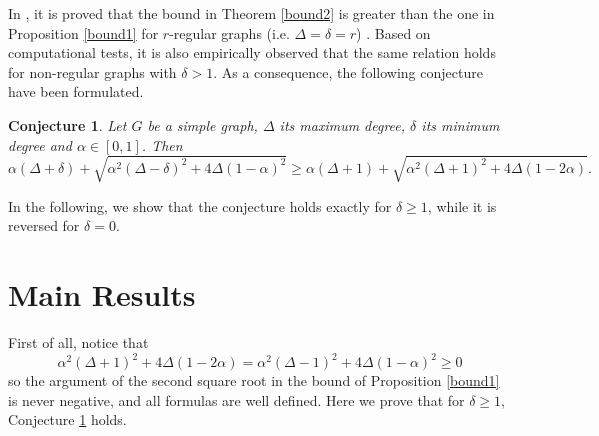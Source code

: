 \documentclass[a4paper,10pt]{article}
\theoremstyle{definition}
\theoremstyle{plain}
\newtheorem{conjecture}{Conjecture}
\begin{document}
In \cite{1}, it is proved that the bound in Theorem \ref{bound2}  is greater than the one in Proposition \ref{bound1} for $r$-regular graphs (i.e. $\Delta=\delta=r$) . Based on computational tests, it is also empirically observed that the same relation holds for non-regular graphs with $\delta>1$. As a consequence, the following conjecture have been formulated.

\begin{conjecture}
\label{conj}  \cite{1}  Let $G$ be a simple graph, $\Delta$ its maximum degree, $\delta$ its minimum degree and $\alpha\in [0,1]$. Then 
    \[
    \alpha(\Delta + \delta) +\sqrt{\alpha^2(\Delta-\delta)^2 + 4\Delta(1-\alpha)^2}
    \ge 
     \alpha(\Delta + 1) +\sqrt{\alpha^2(\Delta+1)^2 + 4\Delta(1-2\alpha)}.
    \]\end{conjecture}

In the following, we show that the conjecture holds exactly for $\delta\ge 1$, while it is reversed for $\delta=0$. 

\section{Main Results}


First of all, notice that 
\begin{equation}
    \label{eq:sec_rad}
\alpha^2(\Delta+1)^2 + 4\Delta(1-2\alpha) = \alpha^2(\Delta-1)^2 + 4\Delta(1-\alpha)^2 \ge 0
\end{equation}
so the argument of the second square root in the bound of Proposition \ref{bound1} is never negative, and all formulas are well defined. Here we prove that for $\delta \ge 1$, Conjecture \ref{conj} holds.
\end{document}
